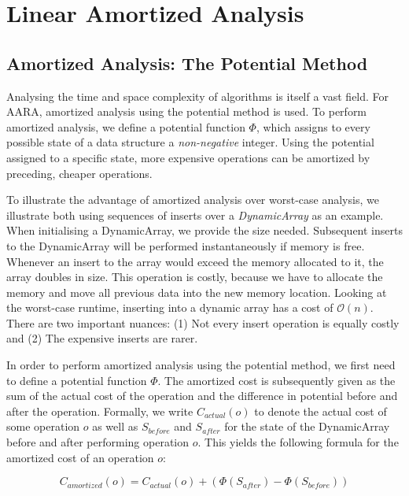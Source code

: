\chapter{Linear Amortized Analysis} \label{chap:linear}

\section{Amortized Analysis: The Potential Method}
Analysing the time and space complexity of algorithms is itself a vast field. For AARA, amortized analysis using the potential method is used. To perform amortized analysis, we define a potential function \(\Phi\), which assigns to every possible state of a data structure a \emph{non-negative} integer. Using the potential assigned to a specific state, more expensive operations can be amortized by preceding, cheaper operations.

To illustrate the advantage of amortized analysis over worst-case analysis, we illustrate both using sequences of inserts over a \emph{DynamicArray} as an example. When initialising a DynamicArray, we provide the size needed. Subsequent inserts to the DynamicArray will be performed instantaneously if memory is free. Whenever an insert to the array would exceed the memory allocated to it, the array doubles in size.
This operation is costly, because we have to allocate the memory and move all previous data into the new memory location. Looking at the worst-case runtime, inserting into a dynamic array has a cost of \(\mathcal{O}(n)\). There are two important nuances: (1) Not every insert operation is equally costly and (2) The expensive inserts are rarer.

In order to perform amortized analysis using the potential method, we first need to define a potential function \(\Phi\). The amortized cost is subsequently given as the sum of the actual cost of the operation and the difference in potential before and after the operation. Formally, we write \(C_{actual}(o)\) to denote the actual cost of some operation \(o\) as well as \(S_{before}\) and \(S_{after}\) for the state of the DynamicArray before and after performing operation \(o\). This yields the following formula for the amortized cost of an operation \(o\):

\[C_{amortized}(o) = C_{actual}(o) + (\Phi(S_{after}) - \Phi(S_{before}))\]
\label{eq:amortized-cost}

